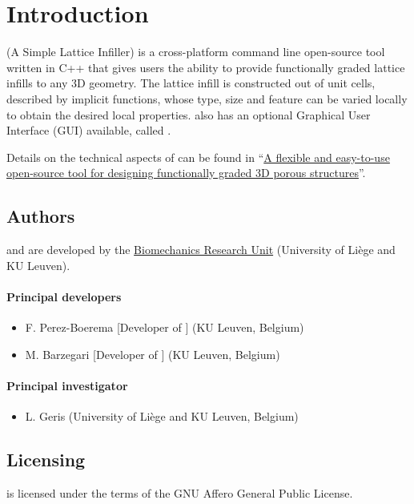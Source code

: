 \section{Introduction} \label{sec:intro}
\asli{} (A Simple Lattice Infiller) is a cross-platform command line open-source tool written in C++ that gives users the ability to provide functionally graded lattice infills to any 3D geometry. The lattice infill is constructed out of unit cells, described by implicit functions, whose type, size and feature can be varied locally to obtain the desired local properties. \asli{} also has an optional Graphical User Interface (GUI) available, called \qasli{}.

Details on the technical aspects of \asli{} can be found in ``\href{https://doi.org/10.1080/17452759.2022.2048956}{A flexible and easy-to-use open-source tool for designing functionally graded 3D porous structures}''.

\subsection{Authors} \label{sec:authors}
\asli{} and \qasli{} are developed by the \href{http://www.biomech.ulg.ac.be}{Biomechanics Research Unit} (University of Li\`{e}ge and KU Leuven). %

\paragraph*{Principal developers}
\begin{itemize}
	\item F. Perez-Boerema [Developer of \asli{}] (KU Leuven, Belgium)
	\item M. Barzegari [Developer of \qasli{}] (KU Leuven, Belgium)
\end{itemize}

\paragraph*{Principal investigator}
\begin{itemize}
	\item L. Geris (University of Li\`{e}ge and KU Leuven, Belgium)
\end{itemize}

\subsection{Licensing} \label{sec:licensing}
\asli{} is licensed under the terms of the GNU Affero General Public License.

